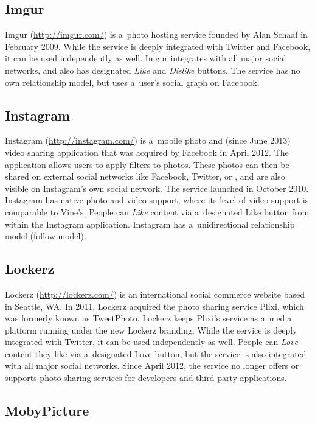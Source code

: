 \subsection{Imgur}

Imgur (\url{http://imgur.com/})
is a~photo hosting service
founded by Alan Schaaf in February 2009.
While the service is deeply integrated with Twitter
and Facebook, it can be used independently as well.
Imgur integrates with all major social networks,
and also has designated \emph{Like} and \emph{Dislike} buttons.
The service has no own relationship model,
but uses a~user's social graph on Facebook.

\subsection{Instagram}
\label{sec:instagram}

Instagram (\url{http://instagram.com/})
is a~mobile photo and (since June 2013) video sharing application
that was acquired by Facebook in April 2012.
The application allows users to apply filters to photos.
These photos can then be shared on external social networks
like Facebook, Twitter, or \googleplus,
and are also visible on Instagram's own social network.
The service launched in October 2010.
Instagram has native photo and video support,
where its level of video support is comparable to Vine's.
People can \emph{Like} content via a~designated Like button
from within the Instagram application.
Instagram has a~unidirectional relationship model (follow model).

\subsection{Lockerz}

Lockerz (\url{http://lockerz.com/}) is an international
social commerce website based in Seattle, WA.
In 2011, Lockerz acquired the photo sharing service Plixi,
which was formerly known as TweetPhoto.
Lockerz keeps Plixi's service as a~media platform running
under the new Lockerz branding.
While the service is deeply integrated with Twitter,
it can be used independently as well.
People can \emph{Love} content they like via
a~designated Love button,
but the service is also integrated with all major social networks.
Since April 2012, the service no longer offers or supports
photo-sharing services for developers and third-party applications.

\subsection{MobyPicture}

